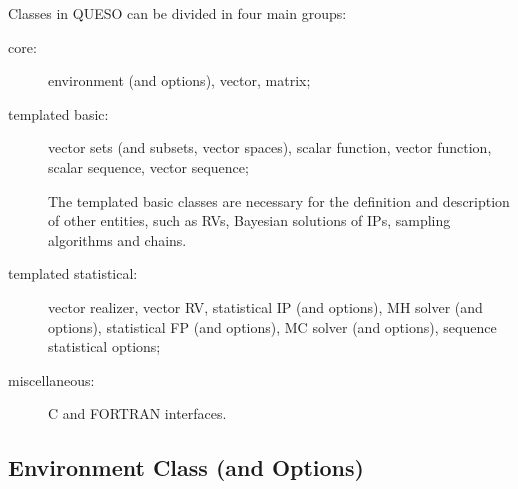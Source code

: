 Classes in QUESO can be divided in four main groups:
\begin{description}
\item[ core:] environment (and options), vector, matrix;

\item[ templated basic:] vector sets (and subsets, vector spaces),  scalar function, vector function, scalar sequence, vector sequence;

The templated basic classes are necessary for the definition and description of other entities, such as RVs, Bayesian solutions of IPs, sampling algorithms and chains.


\item[ templated statistical:] vector realizer, vector RV, statistical IP (and options), MH solver (and options), statistical FP (and options), MC solver (and options), sequence statistical options;
\item[ miscellaneous:] C and FORTRAN interfaces.
\end{description}



\subsection{Environment Class (and Options)}

